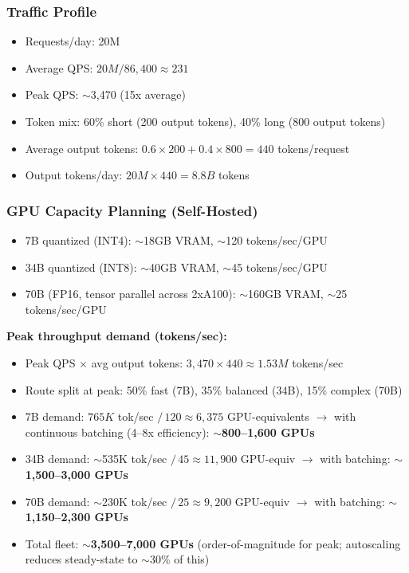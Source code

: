 \subsubsection*{Traffic Profile}

\begin{itemize}
  \item Requests/day: 20M
  \item Average QPS: $20M / 86{,}400 \approx 231$
  \item Peak QPS: $\sim$3,470 (15x average)
  \item Token mix: 60\% short (200 output tokens), 40\% long (800 output tokens)
  \item Average output tokens: $0.6 \times 200 + 0.4 \times 800 = 440$ tokens/request
  \item Output tokens/day: $20M \times 440 = 8.8B$ tokens
\end{itemize}

\subsubsection*{GPU Capacity Planning (Self-Hosted)}

\begin{itemize}
  \item 7B quantized (INT4): $\sim$18GB VRAM, $\sim$120 tokens/sec/GPU
  \item 34B quantized (INT8): $\sim$40GB VRAM, $\sim$45 tokens/sec/GPU
  \item 70B (FP16, tensor parallel across 2xA100): $\sim$160GB VRAM, $\sim$25 tokens/sec/GPU
\end{itemize}

\textbf{Peak throughput demand (tokens/sec):}

\begin{itemize}
  \item Peak QPS $\times$ avg output tokens: $3{,}470 \times 440 \approx 1.53M$ tokens/sec
  \item Route split at peak: 50\% fast (7B), 35\% balanced (34B), 15\% complex (70B)
  \item 7B demand: $765K$ tok/sec $/\, 120 \approx 6{,}375$ GPU-equivalents $\rightarrow$ with continuous batching (4--8x efficiency): \textbf{$\sim$800--1,600 GPUs}
  \item 34B demand: $\sim$535K tok/sec $/\, 45 \approx 11{,}900$ GPU-equiv $\rightarrow$ with batching: \textbf{$\sim$1,500--3,000 GPUs}
  \item 70B demand: $\sim$230K tok/sec $/\, 25 \approx 9{,}200$ GPU-equiv $\rightarrow$ with batching: \textbf{$\sim$1,150--2,300 GPUs}
  \item Total fleet: \textbf{$\sim$3,500--7,000 GPUs} (order-of-magnitude for peak; autoscaling reduces steady-state to $\sim$30\% of this)
\end{itemize}

